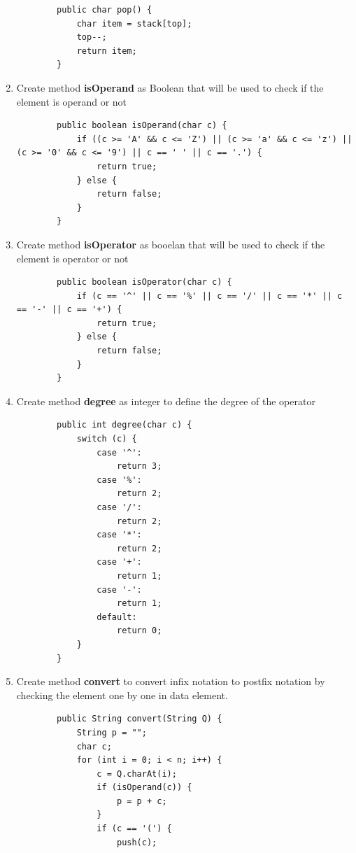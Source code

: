 \documentclass[12pt,titlepage]{article}
\begin{document}
\begin{enumerate}
\begin{verbatim}
        public char pop() {
            char item = stack[top];
            top--;
            return item;
        }
    \end{verbatim}
    \item Create method \textbf{isOperand} as Boolean that will be used to check if the element is operand or not
    \begin{verbatim}
        public boolean isOperand(char c) {
            if ((c >= 'A' && c <= 'Z') || (c >= 'a' && c <= 'z') || (c >= '0' && c <= '9') || c == ' ' || c == '.') {
                return true;
            } else {
                return false;
            }
        }
    \end{verbatim}
    \item Create method \textbf{isOperator} as booelan that will be used to check if the element is operator or not
    \begin{verbatim}
        public boolean isOperator(char c) {
            if (c == '^' || c == '%' || c == '/' || c == '*' || c == '-' || c == '+') {
                return true;
            } else {
                return false;
            }
        } 
    \end{verbatim}
    \item Create method \textbf{degree} as integer to define the degree of the operator
    \begin{verbatim}
        public int degree(char c) {
            switch (c) {
                case '^':
                    return 3; 
                case '%':
                    return 2; 
                case '/':
                    return 2; 
                case '*':
                    return 2; 
                case '+':
                    return 1; 
                case '-':
                    return 1; 
                default:
                    return 0;
            }
        }
    \end{verbatim}
    \item Create method \textbf{convert} to convert infix notation to postfix notation by checking the element one by one in data element.
    \begin{verbatim}
        public String convert(String Q) {
            String p = "";
            char c;
            for (int i = 0; i < n; i++) {
                c = Q.charAt(i);
                if (isOperand(c)) {
                    p = p + c;
                }
                if (c == '(') {
                    push(c);

\end{verbatim}
\end{enumerate}
\end{document}
